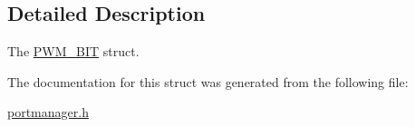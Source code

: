 \subsection{Detailed Description}
The \hyperlink{structPWM__16BIT}{P\+W\+M\+\_\+B\+IT} struct. 

The documentation for this struct was generated from the following file\+:\begin{DoxyCompactItemize}
\item 
\hyperlink{portmanager_8h}{portmanager.\+h}\end{DoxyCompactItemize}

